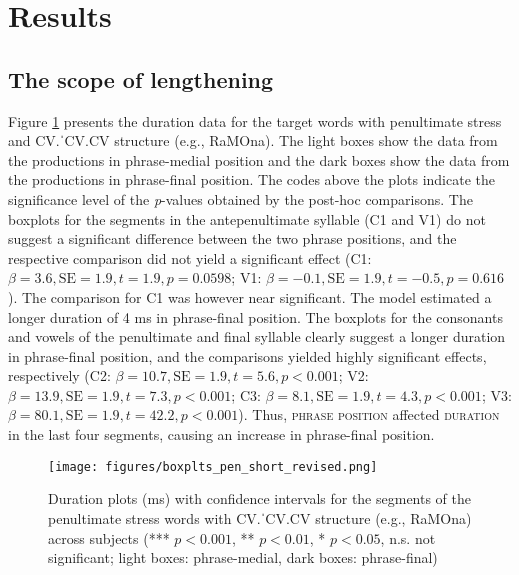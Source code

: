 \documentclass[output=paper]{langscibook}
\begin{document}
\section{Results}\label{results}
\subsection{The scope of lengthening}
Figure \ref{fig:pen_short} presents the duration data for the target words with penultimate stress and CV.ˈCV.CV structure (e.g., RaMOna). The light boxes show the data from the productions in phrase-medial position and the dark boxes show the data from the productions in phrase-final position. The codes above the plots indicate the significance level of the \textit{p}-values obtained by the post-hoc comparisons. The boxplots for the segments in the antepenultimate syllable (C1 and V1) do not suggest a significant difference between the two phrase positions, and the respective comparison did not yield a significant effect (C1: $\beta=3.6,\allowbreak \text{SE}=1.9,\allowbreak t=1.9,\allowbreak p=0.0598$; V1: $\beta=-0.1,\allowbreak \text{SE}=1.9,\allowbreak t=-0.5,\allowbreak p=0.616$). The comparison for C1 was however near significant. The model estimated a longer duration of 4 ms in phrase-final position. The boxplots for the consonants and vowels of the penultimate and final syllable clearly suggest a longer duration in phrase-final position, and the comparisons yielded highly significant effects, respectively (C2: $\beta=10.7,\allowbreak \text{SE}=1.9,\allowbreak t=5.6,\allowbreak p<0.001$; V2: $\beta=13.9,\allowbreak \text{SE}=1.9,\allowbreak t=7.3,\allowbreak p<0.001$; C3: $\beta=8.1,\allowbreak \text{SE}=1.9,\allowbreak t=4.3,\allowbreak p<0.001$; V3: $\beta=80.1,\allowbreak \text{SE}=1.9,\allowbreak t=42.2,\allowbreak p<0.001$). Thus, \textsc{phrase position} affected \textsc{duration} in the last four segments, causing an increase in phrase-final position.

\begin{figure}%
    \centering
    \texttt{[image: figures/boxplts\_pen\_short\_revised.png]}
    \caption{Duration plots (ms) with confidence intervals for the segments of the penultimate stress words with CV.ˈCV.CV structure (e.g., RaMOna) across subjects (*** $p<0.001$, ** $p<0.01$, * $p<0.05$, n.s. not significant; light boxes: phrase-medial, dark boxes: phrase-final)}
    \label{fig:pen_short}
\end{figure}
\end{document}

